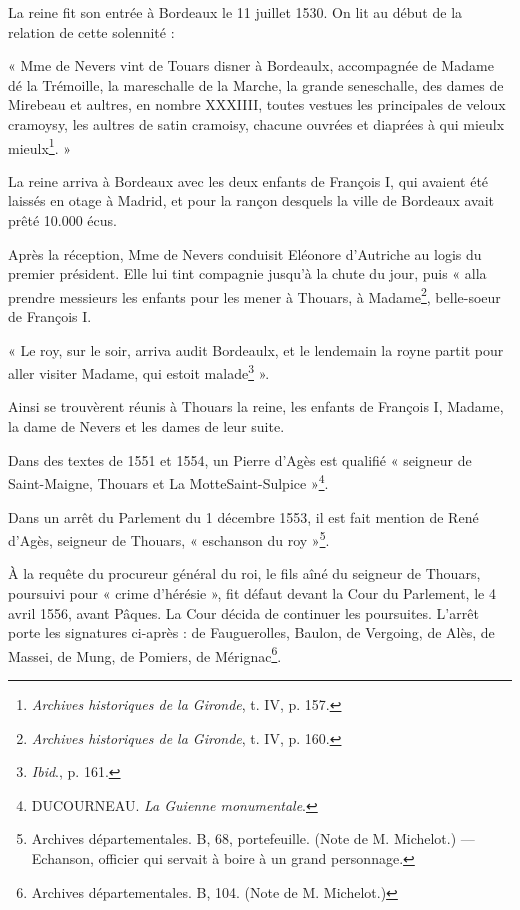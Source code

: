 La reine fit son entrée à Bordeaux le 11 juillet 1530. On lit au début de la relation de cette solennité :

« Mme de Nevers vint de Touars disner à Bordeaulx, accompagnée de Madame dé la Trémoille, la mareschalle de la Marche, la grande seneschalle, des dames de Mirebeau et aultres, en nombre XXXIIII, toutes vestues les principales de veloux cramoysy, les aultres de satin cramoisy, chacune ouvrées et diaprées à qui mieulx mieulx\footnote{\textit{Archives historiques de la Gironde}, t. IV, p. 157.}. »

La reine arriva à Bordeaux avec les deux enfants de François I\ier{}, qui avaient été laissés en otage à Madrid, et pour la rançon desquels la ville de Bordeaux avait prêté 10.000 écus.

Après la réception, Mme de Nevers conduisit Eléonore d'Autriche au logis du premier président. Elle lui tint compagnie jusqu'à la chute du jour, puis « alla prendre messieurs les enfants pour les mener à Thouars, à Madame\footnote{\textit{Archives historiques de la Gironde}, t. IV, p. 160.}, belle-soeur de François I\ier{}.

« Le roy, sur le soir, arriva audit Bordeaulx, et le lendemain la royne partit pour aller visiter Madame, qui estoit malade\footnote{\textit{Ibid}., p. 161.} ».

Ainsi se trouvèrent réunis à Thouars la reine, les enfants de François I\ier{}, Madame, la dame de Nevers et les dames de leur suite.

Dans des textes de 1551 et 1554, un Pierre d'Agès est qualifié « seigneur de Saint-Maigne, Thouars et La MotteSaint-Sulpice »\footnote{DUCOURNEAU. \textit{La Guienne monumentale}.}.

Dans un arrêt du Parlement du 1\ier{} décembre 1553, il est fait mention de René d'Agès, seigneur de Thouars, « eschanson du roy »\footnote{Archives départementales. B, 68, portefeuille. (Note de M. Michelot.) — Echanson, officier qui servait à boire à un grand personnage.}.

À la requête du procureur général du roi, le fils aîné du seigneur de Thouars, poursuivi pour « crime d'hérésie », fit défaut devant la Cour du Parlement, le 4 avril 1556, avant Pâques. La Cour décida de continuer les poursuites. L'arrêt porte les signatures ci-après : de Fauguerolles, Baulon, de Vergoing, de Alès, de Massei, de Mung, de Pomiers, de Mérignac\footnote{Archives départementales. B, 104. (Note de M. Michelot.)}.

